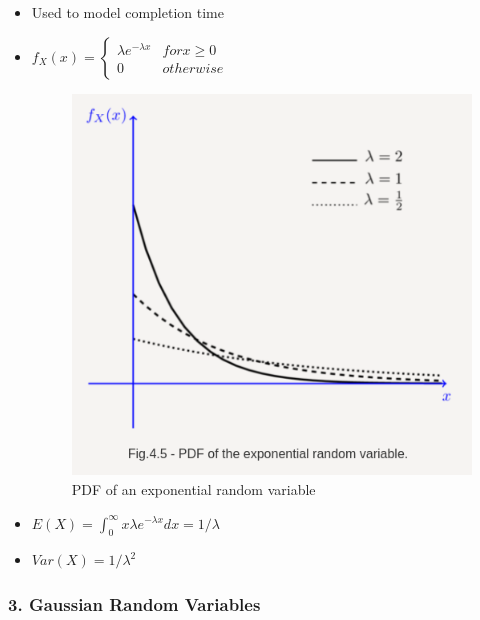 \begin{itemize}
\item
  Used to model completion time
\item
  \(f_X(x) = \begin{cases}\lambda e^{-\lambda x} & for x\geq 0\\0 & otherwise\end{cases}\)

  \begin{figure}[''h!'']
  \centering
  \includegraphics{Lecture 13 Notes e842fef9a3e0449fa78bac59b75dbc5c/Screenshot_from_2021-08-06_23-06-49.png}
  \caption{PDF of an exponential random variable}
  \end{figure}
\item
  \(E(X) = \displaystyle\int_{0}^{\infty}x\lambda e^{-\lambda x}dx=1/\lambda\)
\item
  \(Var(X) = 1/\lambda ^2\)
\end{itemize}

\hypertarget{gaussian-random-variables}{%
\subsubsection{3. Gaussian Random
Variables}\label{gaussian-random-variables}}

